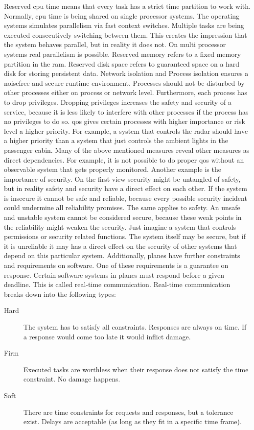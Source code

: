 \documentclass[titlepage]{report}
\begin{document}
Reserved \gls{cpu} time means that every task has a strict time partition to work with.
Normally, cpu time is being shared on single processor systems. The operating systems simulates
parallelism via fast context switches. Multiple tasks are being executed consecutively switching
between them. This creates the impression that the system behaves parallel, but in reality it does not.
On multi processor systems real parallelism is possible. Reserved memory refers to a fixed memory
partition in the \gls{ram}. Reserved disk space refers to guaranteed space on a hard disk for storing
persistent data. Network isolation and Process isolation ensures a noisefree and secure runtime environment.
Processes should not be disturbed by other processes either on process or network level. Furthermore,
each process has to drop privileges. Dropping privileges increases the safety and security of a service,
because it is less likely to interfere with other processes if the process has no privileges to do so.
\gls{qos} gives certain processes with higher importance or risk level a higher priority. For example,
a system that controls the radar should have a higher priority than a system that just controls
the ambient lights in the passenger cabin.
Many of the above mentioned measures reveal other measures as direct dependencies. For example,
it is not possible to do proper \gls{qos} without an observable system that gets properly monitored.
Another example is the importance of security. On the first view security might be untangled of safety,
but in reality safety and security have a direct effect on each other. If the system is insecure it cannot
be safe and reliable, because every possible security incident could undermine all reliability promises.
The same applies to safety. An unsafe and unstable system cannot be considered secure, because these
weak points in the reliability might weaken the security. Just imagine a system that controls
permissions or security related functions. The system itself may be secure, but if it is unreliable 
it may has a direct effect on the security of other systems that depend on this particular system.
Additionally, planes have further constraints and requirements on software. One of these requirements
is a guarantee on response. Certain software systems in planes must respond before a given deadline.
This is called real-time communication. Real-time communication breaks down into the following types\cite{worn2006echtzeitsysteme}:

\begin{description}
    \item[Hard] The system has to satisfy all constraints. Responses are always on time. If a response would come too late it would inflict damage.
    \item[Firm] Executed tasks are worthless when their response does not satisfy the time constraint. No damage happens.
    \item[Soft] There are time constraints for requests and responses, but a tolerance exist. Delays are acceptable (as long as they fit in a specific time frame).
\end{description}
\end{document}

